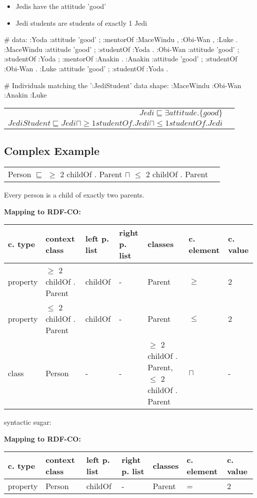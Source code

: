 \documentclass{llncs}
\newenvironment{gcotable}{
  \scriptsize
  \sffamily
  \vspace{0cm}
	\begin{center}
	\textbf{\vspace{0.4cm}Mapping to RDF-CO:} \\
  \begin{tabular}{l|l|l|l|l|l|l}
	\hline
  \textbf{c. type} & \textbf{context class} & \textbf{left p. list} & \textbf{right p. list} & \textbf{classes} & \textbf{c. element} & \textbf{c. value} \\
  \hline

}{
  \hline
  \end{tabular}
	\end{center}
}
\newenvironment{DL}{
  \vspace{0cm}
	\begin{center}
  \begin{tabular}{r l}

}{
  \end{tabular}
	\end{center}
}
\begin{document}
\begin{itemize}
	\item Jedis have the attitude 'good'
	\item Jedi students are students of exactly 1 Jedi
\end{itemize}

\begin{ex}
# data:
:Yoda 
    :attitude 'good' ;
    :mentorOf :MaceWindu , :Obi-Wan , :Luke .
:MaceWindu
    :attitude 'good' ;
    :studentOf :Yoda .
:Obi-Wan 
    :attitude 'good' ;
    :studentOf :Yoda ;
    :mentorOf :Anakin .
:Anakin
    :attitude 'good' ; 
    :studentOf :Obi-Wan .
:Luke
    :attitude 'good' ;
    :studentOf :Yoda .
\end{ex}

\begin{ex}
# Individuals matching the ’:JediStudent’ data shape:
:MaceWindu :Obi-Wan :Anakin :Luke
\end{ex}

\begin{DL}
$Jedi \sqsubseteq \exists attitude.\{good\} $\\
$JediStudent \sqsubseteq Jedi \sqcap \geq1 studentOf.Jedi \sqcap \leq1 studentOf.Jedi$ \\
\end{DL}

\subsection{Complex Example}

\begin{DL}
Person $\sqsubseteq$ $\geq$ 2 childOf . Parent $\sqcap$ $\leq$  2 childOf . Parent \\
\end{DL}

Every person is a child of exactly two parents.

\begin{gcotable}
property & $\geq$ 2 childOf . Parent & childOf & - & Parent & $\geq$ & 2 \\
property & $\leq$ 2 childOf . Parent & childOf & - & Parent & $\leq$ & 2 \\
class & Person & - & - & $\geq$ 2 childOf . Parent, $\leq$ 2 childOf . Parent & $\sqcap$ & - \\
\end{gcotable}

syntactic sugar:

\begin{gcotable}
property & Person & childOf & - & Parent & = & 2 \\
\end{gcotable}
\end{document}
